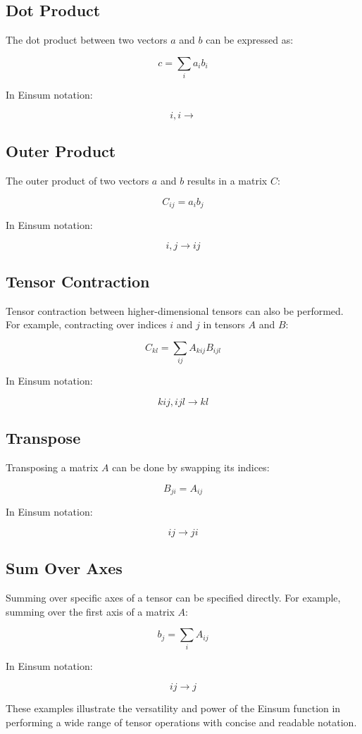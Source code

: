 \subsection{Dot Product}

The dot product between two vectors $a$ and $b$ can be expressed as:

\[
c = \sum_{i} a_{i} b_{i}
\]

In Einsum notation:

\[
i,i \rightarrow
\]

\subsection{Outer Product}

The outer product of two vectors $a$ and $b$ results in a matrix $C$:

\[
C_{ij} = a_{i} b_{j}
\]

In Einsum notation:

\[
i,j \rightarrow ij
\]

\subsection{Tensor Contraction}

Tensor contraction between higher-dimensional tensors can also be performed.
For example, contracting over indices $i$ and $j$ in tensors $A$ and $B$:

\[
C_{kl} = \sum_{ij} A_{kij} B_{ijl}
\]

In Einsum notation:

\[
kij,ijl \rightarrow kl
\]

\subsection{Transpose}

Transposing a matrix $A$ can be done by swapping its indices:

\[
B_{ji} = A_{ij}
\]

In Einsum notation:

\[
ij \rightarrow ji
\]

\subsection{Sum Over Axes}

Summing over specific axes of a tensor can be specified directly. For example,
summing over the first axis of a matrix $A$:

\[
b_{j} = \sum_{i} A_{ij}
\]

In Einsum notation:

\[
ij \rightarrow j
\]

\noindent
These examples illustrate the versatility and power of the Einsum function
in performing a wide range of tensor operations with concise and readable notation.

